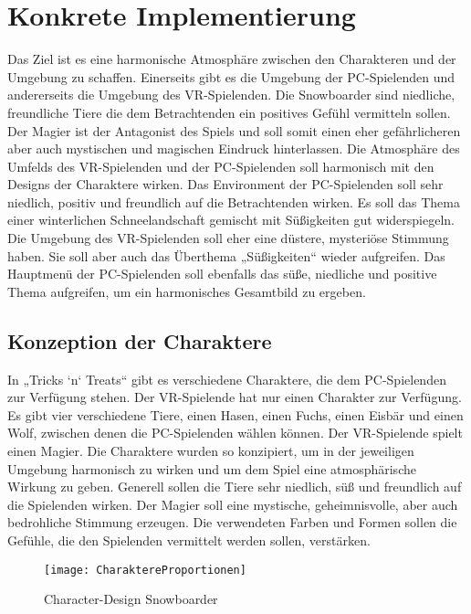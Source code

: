 \chapter{Konkrete Implementierung}
Das Ziel ist es eine harmonische Atmosphäre zwischen den Charakteren und der Umgebung zu schaffen. Einerseits gibt es die Umgebung der PC-Spielenden und andererseits die Umgebung des VR-Spielenden. Die Snowboarder sind niedliche, freundliche Tiere die dem Betrachtenden ein positives Gefühl vermitteln sollen. Der Magier ist der Antagonist des Spiels und soll somit einen eher gefährlicheren aber auch mystischen und magischen Eindruck hinterlassen. Die Atmosphäre des Umfelds des VR-Spielenden und der PC-Spielenden soll harmonisch mit den Designs der Charaktere wirken. Das Environment der PC-Spielenden soll sehr niedlich, positiv und freundlich auf die Betrachtenden wirken. Es soll das Thema einer winterlichen Schneelandschaft gemischt mit Süßigkeiten gut widerspiegeln. Die Umgebung des VR-Spielenden soll eher eine düstere, mysteriöse Stimmung haben. Sie soll aber auch das Überthema „Süßigkeiten“ wieder aufgreifen. Das Hauptmenü der PC-Spielenden soll ebenfalls das süße, niedliche und positive Thema aufgreifen, um ein harmonisches Gesamtbild zu ergeben.

\section{Konzeption der Charaktere}
In „Tricks ‘n‘ Treats“ gibt es verschiedene Charaktere, die dem PC-Spielenden zur Verfügung stehen. Der VR-Spielende hat nur einen Charakter zur Verfügung. Es gibt vier verschiedene Tiere, einen Hasen, einen Fuchs, einen Eisbär und einen Wolf, zwischen denen die PC-Spielenden wählen können. Der VR-Spielende spielt einen Magier. Die Charaktere wurden so konzipiert, um in der jeweiligen Umgebung harmonisch zu wirken und um dem Spiel eine atmosphärische Wirkung zu geben. Generell sollen die Tiere sehr niedlich, süß und freundlich auf die Spielenden wirken. Der Magier soll eine mystische, geheimnisvolle, aber auch bedrohliche Stimmung erzeugen. Die verwendeten Farben und Formen sollen die Gefühle, die den Spielenden vermittelt werden sollen, verstärken.
 
 \begin{figure}[H]
 	\centering
 	\texttt{[image: CharaktereProportionen]}
 	\caption{Character-Design Snowboarder}
 \end{figure}

